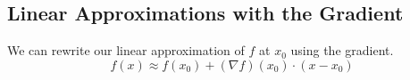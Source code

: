 \subsection{Linear Approximations with the Gradient}
\noindent
We can rewrite our linear approximation of $f$ at $x_0$ using the gradient.
\begin{equation*}
	f(x) \approx f(x_0) + (\nabla f)(x_0) \cdot (x - x_0)
\end{equation*}